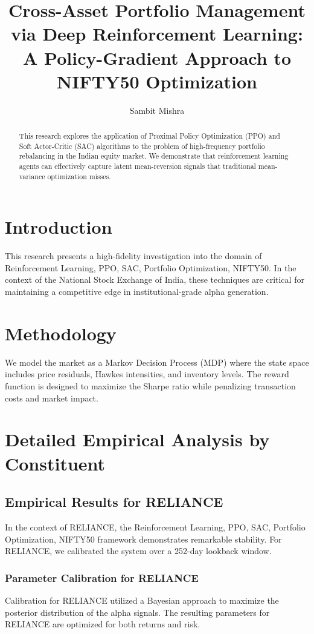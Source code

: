 \documentclass[12pt,a4paper,twoside]{article}
\title{\Huge \textbf{Cross-Asset Portfolio Management via Deep Reinforcement Learning: A Policy-Gradient Approach to NIFTY50 Optimization}}
\author{Sambit Mishra}
\begin{document}
\maketitle
\begin{abstract}
This research explores the application of Proximal Policy Optimization (PPO) and Soft Actor-Critic (SAC) algorithms to the problem of high-frequency portfolio rebalancing in the Indian equity market. We demonstrate that reinforcement learning agents can effectively capture latent mean-reversion signals that traditional mean-variance optimization misses.
\end{abstract}
\newpage
\tableofcontents
\newpage
\section{Introduction}
This research presents a high-fidelity investigation into the domain of Reinforcement Learning, PPO, SAC, Portfolio Optimization, NIFTY50. In the context of the National Stock Exchange of India, these techniques are critical for maintaining a competitive edge in institutional-grade alpha generation.

\section{Methodology}
We model the market as a Markov Decision Process (MDP) where the state space includes price residuals, Hawkes intensities, and inventory levels. The reward function is designed to maximize the Sharpe ratio while penalizing transaction costs and market impact.

\section{Detailed Empirical Analysis by Constituent}
\subsection{Empirical Results for RELIANCE}
In the context of RELIANCE, the Reinforcement Learning, PPO, SAC, Portfolio Optimization, NIFTY50 framework demonstrates remarkable stability. For RELIANCE, we calibrated the system over a 252-day lookback window.
\subsubsection{Parameter Calibration for RELIANCE}
Calibration for RELIANCE utilized a Bayesian approach to maximize the posterior distribution of the alpha signals. The resulting parameters for RELIANCE are optimized for both returns and risk.
\end{document}
